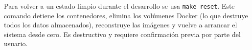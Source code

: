 Para volver a un estado limpio durante el desarrollo se usa
\texttt{make reset}. Este comando detiene los contenedores, elimina los
volúmenes Docker (lo que destruye todos los datos almacenados),
reconstruye las imágenes y vuelve a arrancar el sistema desde cero. Es
destructivo y requiere confirmación previa por parte del usuario.
